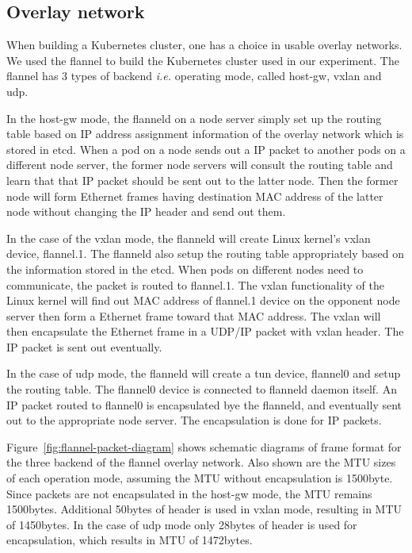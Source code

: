 \subsection{Overlay network}

When building a Kubernetes cluster, one has a choice in usable overlay networks.
We used the flannel to build the Kubernetes cluster used in our experiment. 
The flannel has 3 types of backend {\it i.e.} operating mode, called host-gw, vxlan and udp\cite{CoreOSFlannelBackend}.

In the host-gw mode, the flanneld on a node server simply set up the routing table 
based on IP address assignment information of the overlay network which is stored in etcd. 
When a pod on a node sends out a IP packet to another pods on a different node server, 
the former node servers will consult the routing table and learn that that IP packet should be sent out to the latter node.
Then the former node will form Ethernet frames having destination MAC address of the latter node without changing the IP header and send out them.

In the case of the vxlan mode, the flanneld will create Linux kernel's vxlan device, flannel.1. 
The flanneld also setup the routing table appropriately based on the information stored in the etcd.
When pods on different nodes need to communicate, the packet is routed to flannel.1.
The vxlan functionality of the Linux kernel will find out MAC address of flannel.1 device on the opponent node server 
then form a Ethernet frame toward that MAC address.
The vxlan will then encapsulate the Ethernet frame in a UDP/IP packet with vxlan header.
The IP packet is sent out eventually.

In the case of udp mode, the flanneld will create a tun device, flannel0 and setup the routing table.
The flannel0 device is connected to flanneld daemon itself.
An IP packet routed to flannel0 is encapsulated bye the flanneld, and eventually sent out 
to the appropriate node server. 
The encapsulation is done for IP packets.

Figure~\ref{fig:flannel-packet-diagram} shows schematic diagrams of frame format for the three backend of 
the flannel overlay network.
Also shown are the MTU sizes of each operation mode, assuming the MTU without encapsulation is 1500byte.
Since packets are not encapsulated in the host-gw mode, the MTU remains 1500bytes.
Additional 50bytes of header is used in vxlan mode, resulting in MTU of 1450bytes.
In the case of udp mode only 28bytes of header is used for encapsulation, which results in MTU of 1472bytes.


